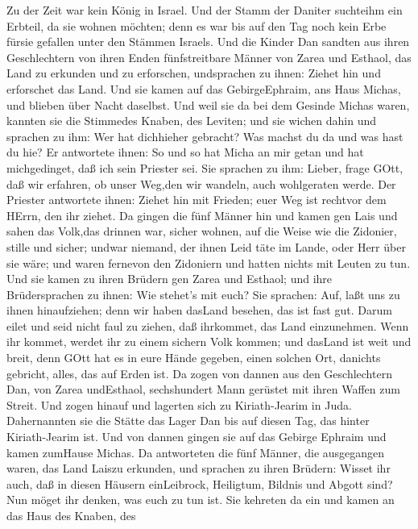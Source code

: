  Zu der Zeit war kein König in Israel. Und der Stamm der
Daniter suchteihm ein Erbteil, da sie wohnen möchten; denn es war bis
auf den Tag noch kein Erbe fürsie gefallen unter den Stämmen Israels.
 Und die Kinder Dan sandten aus ihren Geschlechtern von
ihren Enden fünfstreitbare Männer von Zarea und Esthaol, das Land zu
erkunden und zu erforschen, undsprachen zu ihnen: Ziehet hin und
erforschet das Land. Und sie kamen auf das GebirgeEphraim, ans Haus
Michas, und blieben über Nacht daselbst.  Und weil sie da
bei dem Gesinde Michas waren, kannten sie die Stimmedes Knaben, des
Leviten; und sie wichen dahin und sprachen zu ihm: Wer hat dichhieher
gebracht? Was machst du da und was hast du hie?  Er
antwortete ihnen: So und so hat Micha an mir getan und hat michgedinget,
daß ich sein Priester sei.  Sie sprachen zu ihm: Lieber,
frage GOtt, daß wir erfahren, ob unser Weg,den wir wandeln, auch
wohlgeraten werde.  Der Priester antwortete ihnen: Ziehet
hin mit Frieden; euer Weg ist rechtvor dem HErrn, den ihr ziehet.
 Da gingen die fünf Männer hin und kamen gen Lais und sahen
das Volk,das drinnen war, sicher wohnen, auf die Weise wie die Zidonier,
stille und sicher; undwar niemand, der ihnen Leid täte im Lande, oder
Herr über sie wäre; und waren fernevon den Zidoniern und hatten nichts
mit Leuten zu tun.  Und sie kamen zu ihren Brüdern gen Zarea
und Esthaol; und ihre Brüdersprachen zu ihnen: Wie stehet's mit euch?
 Sie sprachen: Auf, laßt uns zu ihnen hinaufziehen; denn wir
haben dasLand besehen, das ist fast gut. Darum eilet und seid nicht faul
zu ziehen, daß ihrkommet, das Land einzunehmen.  Wenn ihr
kommet, werdet ihr zu einem sichern Volk kommen; und dasLand ist weit
und breit, denn GOtt hat es in eure Hände gegeben, einen solchen Ort,
danichts gebricht, alles, das auf Erden ist.  Da zogen von
dannen aus den Geschlechtern Dan, von Zarea undEsthaol, sechshundert
Mann gerüstet mit ihren Waffen zum Streit.  Und zogen
hinauf und lagerten sich zu Kiriath-Jearim in Juda. Dahernannten sie die
Stätte das Lager Dan bis auf diesen Tag, das hinter Kiriath-Jearim ist.
 Und von dannen gingen sie auf das Gebirge Ephraim und
kamen zumHause Michas.  Da antworteten die fünf Männer, die
ausgegangen waren, das Land Laiszu erkunden, und sprachen zu ihren
Brüdern: Wisset ihr auch, daß in diesen Häusern einLeibrock, Heiligtum,
Bildnis und Abgott sind? Nun möget ihr denken, was euch zu tun ist.
 Sie kehreten da ein und kamen an das Haus des Knaben, des
